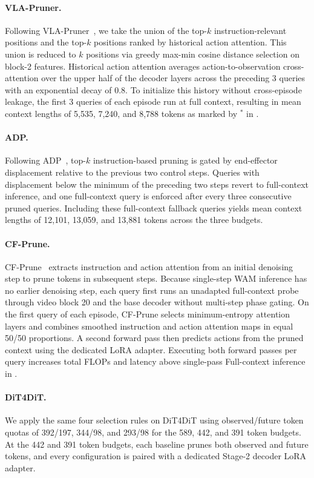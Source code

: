 \paragraph{VLA-Pruner.}
    Following VLA-Pruner~\cite{liu2025vlapruner}, we take the union of the top-$k$ instruction-relevant positions and the top-$k$ positions ranked by historical action attention.
    This union is reduced to $k$ positions via greedy max-min cosine distance selection on block-2 features.
    Historical action attention averages action-to-observation cross-attention over the upper half of the decoder layers across the preceding 3 queries with an exponential decay of 0.8.
    To initialize this history without cross-episode leakage, the first 3 queries of each episode run at full context, resulting in mean context lengths of 5,535, 7,240, and 8,788 tokens as marked by $^*$ in .


\paragraph{ADP.}
    Following ADP~\cite{pei2026adp}, top-$k$ instruction-based pruning is gated by end-effector displacement relative to the previous two control steps.
    Queries with displacement below the minimum of the preceding two steps revert to full-context inference, and one full-context query is enforced after every three consecutive pruned queries.
    Including these full-context fallback queries yields mean context lengths of 12,101, 13,059, and 13,881 tokens across the three budgets.



\paragraph{CF-Prune.}
    CF-Prune~\cite{kim2026cfprune} extracts instruction and action attention from an initial denoising step to prune tokens in subsequent steps.
    Because single-step WAM inference has no earlier denoising step, each query first runs an unadapted full-context probe through video block 20 and the base decoder without multi-step phase gating.
    On the first query of each episode, CF-Prune selects minimum-entropy attention layers and combines smoothed instruction and action attention maps in equal 50/50 proportions.
    A second forward pass then predicts actions from the pruned context using the dedicated LoRA adapter.
    Executing both forward passes per query increases total FLOPs and latency above single-pass Full-context inference in .

\paragraph{DiT4DiT.}
    We apply the same four selection rules on DiT4DiT using observed/future token quotas of 392/197, 344/98, and 293/98 for the 589, 442, and 391 token budgets.
    At the 442 and 391 token budgets, each baseline prunes both observed and future tokens, and every configuration is paired with a dedicated Stage-2 decoder LoRA adapter.
